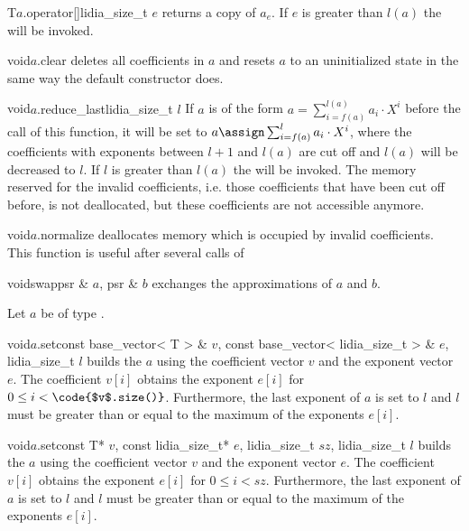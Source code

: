 \begin{fcode}{T}{$a$.operator[]}{lidia_size_t $e$}
  returns a copy of $a_e$.  If $e$ is greater than $l(a)$ the \LEH will be invoked.
\end{fcode}

\begin{fcode}{void}{$a$.clear}{}
  deletes all coefficients in $a$ and resets $a$ to an uninitialized state in the same way the
  default constructor does.
\end{fcode}

\begin{fcode}{void}{$a$.reduce_last}{lidia_size_t $l$}
  If $a$ is of the form $a = \sum_{i=f(a)}^{l(a)} a_i \cdot X^i$ before the call of this
  function, it will be set to $a \assign \sum_{i=f(a)}^l a_i \cdot X^i$, where the coefficients
  with exponents between $l+1$ and $l(a)$ are cut off and $l(a)$ will be decreased to $l$.  If
  $l$ is greater than $l(a)$ the \LEH will be invoked.  The memory reserved for the invalid
  coefficients, i.e.  those coefficients that have been cut off before, is not deallocated, but
  these coefficients are not accessible anymore.
\end{fcode}

\begin{fcode}{void}{$a$.normalize}{}
  deallocates memory which is occupied by invalid coefficients.  This function is useful after
  several calls of 
\end{fcode}

\begin{fcode}{void}{swap}{psr & $a$, psr & $b$}
  exchanges the approximations of $a$ and $b$.
\end{fcode}

Let $a$ be of type .

\begin{fcode}{void}{$a$.set}{const base_vector< T > & $v$,
    const base_vector< lidia_size_t > & $e$, lidia_size_t $l$}%
  builds the  $a$ using the coefficient vector $v$ and the exponent vector
  $e$.  The coefficient $v[i]$ obtains the exponent $e[i]$ for $0 \leq i < \code{$v$.size()}$.
  Furthermore, the last exponent of $a$ is set to $l$ and $l$ must be greater than or equal to
  the maximum of the exponents $e[i]$.
\end{fcode}

\begin{fcode}{void}{$a$.set}{const T* $v$, const lidia_size_t* $e$, lidia_size_t $sz$, lidia_size_t $l$}
  builds the  $a$ using the coefficient vector $v$ and the exponent vector
  $e$.  The coefficient $v[i]$ obtains the exponent $e[i]$ for $ 0 \leq i < sz$.  Furthermore, the
  last exponent of $a$ is set to $l$ and $l$ must be greater than or equal to the maximum of the
  exponents $e[i]$.
\end{fcode}

